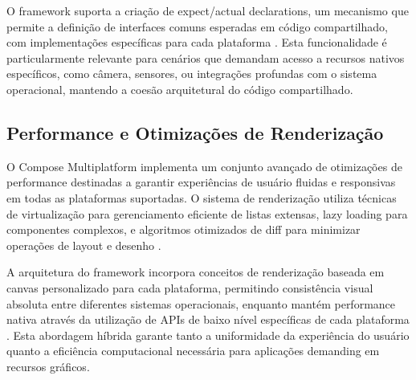 O framework suporta a criação de expect/actual declarations, um mecanismo que permite a definição de interfaces comuns esperadas em código compartilhado, com implementações específicas para cada plataforma \cite{kotlin2023expect}. Esta funcionalidade é particularmente relevante para cenários que demandam acesso a recursos nativos específicos, como câmera, sensores, ou integrações profundas com o sistema operacional, mantendo a coesão arquitetural do código compartilhado.

\subsection{Performance e Otimizações de Renderização}

O Compose Multiplatform implementa um conjunto avançado de otimizações de performance destinadas a garantir experiências de usuário fluidas e responsivas em todas as plataformas suportadas. O sistema de renderização utiliza técnicas de virtualização para gerenciamento eficiente de listas extensas, lazy loading para componentes complexos, e algoritmos otimizados de diff para minimizar operações de layout e desenho \cite{compose2023performance}.

A arquitetura do framework incorpora conceitos de renderização baseada em canvas personalizado para cada plataforma, permitindo consistência visual absoluta entre diferentes sistemas operacionais, enquanto mantém performance nativa através da utilização de APIs de baixo nível específicas de cada plataforma \cite{skia2023graphics}. Esta abordagem híbrida garante tanto a uniformidade da experiência do usuário quanto a eficiência computacional necessária para aplicações demanding em recursos gráficos.
